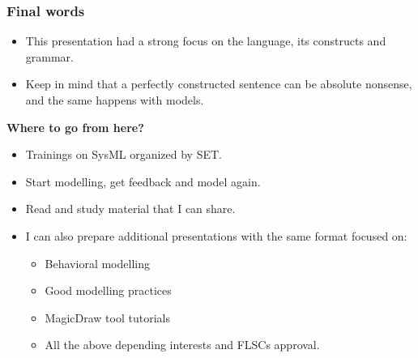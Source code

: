 \documentclass[xcolor=dvipsnames,t]{beamer}
\begin{document}
\begin{frame}
\frametitle {Final words}
\begin{itemize}
\item This presentation had a strong focus on the language, its constructs and grammar.
\item Keep in mind that a perfectly constructed sentence can be absolute nonsense, and the same happens with models.
\end{itemize}

\textbf{Where to go from here?}
\begin{itemize}
\item Trainings on SysML organized by SET.
\item Start modelling, get feedback and model again.
\item Read and study material that I can share.
\item I can also prepare additional presentations with the same format focused on:
\begin{itemize}
\item Behavioral modelling
\item Good modelling practices
\item MagicDraw tool tutorials
\item All the above depending interests and FLSCs approval.
\end{itemize}
\end{itemize}



\end{frame}

\end{document}
